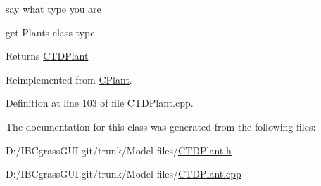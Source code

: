 say what type you are 

get Plant\textquotesingle{}s class type \begin{DoxyReturn}{Returns}
\textquotesingle{}\mbox{\hyperlink{class_c_t_d_plant}{C\+T\+D\+Plant}}\textquotesingle{} 
\end{DoxyReturn}


Reimplemented from \mbox{\hyperlink{class_c_plant_a6f01bbbf4d15243a1e00e85ce1a9de5b}{C\+Plant}}.



Definition at line 103 of file C\+T\+D\+Plant.\+cpp.



The documentation for this class was generated from the following files\+:\begin{DoxyCompactItemize}
\item 
D\+:/\+I\+B\+Cgrass\+G\+U\+I.\+git/trunk/\+Model-\/files/\mbox{\hyperlink{_c_t_d_plant_8h}{C\+T\+D\+Plant.\+h}}\item 
D\+:/\+I\+B\+Cgrass\+G\+U\+I.\+git/trunk/\+Model-\/files/\mbox{\hyperlink{_c_t_d_plant_8cpp}{C\+T\+D\+Plant.\+cpp}}\end{DoxyCompactItemize}
